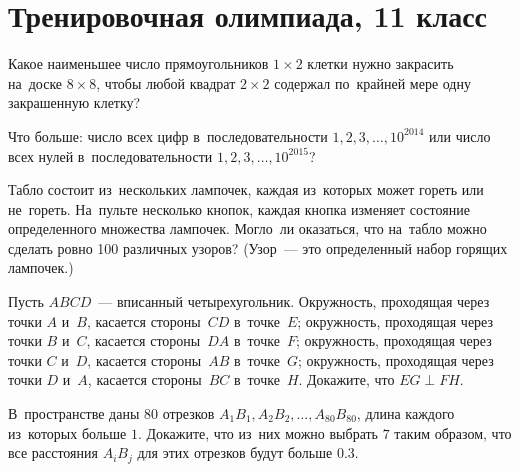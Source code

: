 

\section*{Тренировочная олимпиада, 11 класс}



\begin{problems}

\item
Какое наименьшее число прямоугольников $1 \times 2$ клетки нужно закрасить
на~доске $8 \times 8$, чтобы любой квадрат $2 \times 2$ содержал по~крайней
мере одну закрашенную клетку?

\item
Что больше: число всех цифр в~последовательности
$1, 2, 3, \ldots, 10^{2014}$
или число всех нулей в~последовательности
$1, 2, 3, \ldots, 10^{2015}$?

\item
Табло состоит из~нескольких лампочек, каждая из~которых может гореть или
не~гореть.
На~пульте несколько кнопок, каждая кнопка изменяет состояние определенного
множества лампочек.
Могло~ли оказаться, что на~табло можно сделать ровно 100 различных узоров?
(Узор~--- это определенный набор горящих лампочек.)

\item
Пусть $ABCD$~--- вписанный четырехугольник.
Окружность, проходящая через точки $A$ и~$B$, касается стороны~$CD$
в~точке~$E$;
окружность, проходящая через точки $B$ и~$C$, касается стороны~$DA$
в~точке~$F$;
окружность, проходящая через точки $C$ и~$D$, касается стороны~$AB$
в~точке~$G$;
окружность, проходящая через точки $D$ и~$A$, касается стороны~$BC$
в~точке~$H$.
Докажите, что $EG \perp FH$. 

\item
В~пространстве даны $80$ отрезков
$A_1 B_1, A_2 B_2, \ldots, A_{80} B_{80}$, длина каждого из~которых больше $1$.
Докажите, что из~них можно выбрать $7$ таким образом, что все расстояния
$A_i B_j$ для этих отрезков будут больше $0.3$.

\end{problems}

